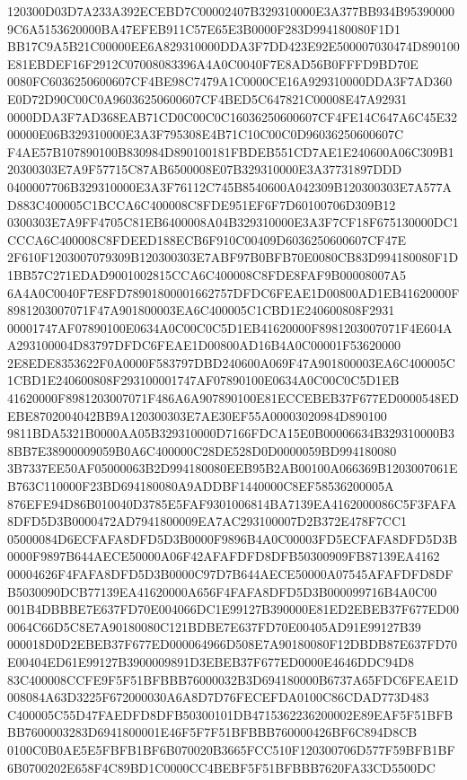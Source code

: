 \documentclass[UTF8,fontset=fandol,zihao=-4,a4paper]{ctexart}
\begin{document}
{{120300D03D7A233A392ECEBD7C00002407B329310000E3A377BB934B953900009C6A5153620000BA47EFEB911C57E65E3B0000F283D994180080F1D1
BB17C9A5B21C00000EE6A829310000DDA3F7DD423E92E500007030474D890100E81EBDEF16F2912C07008083396A4A0C0040F7E8AD56B0FFFD9BD70E
0080FC6036250600607CF4BE98C7479A1C0000CE16A929310000DDA3F7AD360E0D72D90C00C0A96036250600607CF4BED5C647821C00008E47A92931
0000DDA3F7AD368EAB71CD0C00C0C16036250600607CF4FE14C647A6C45E3200000E06B329310000E3A3F795308E4B71C10C00C0D96036250600607C
F4AE57B107890100B830984D890100181FBDEB551CD7AE1E240600A06C309B120300303E7A9F57715C87AB6500008E07B329310000E3A37731897DDD
0400007706B329310000E3A3F76112C745B8540600A042309B120300303E7A577AD883C400005C1BCCA6C400008C8FDE951EF6F7D60100706D309B12
0300303E7A9FF4705C81EB6400008A04B329310000E3A3F7CF18F675130000DC1CCCA6C400008C8FDEED188ECB6F910C00409D6036250600607CF47E
2F610F1203007079309B120300303E7ABF97B0BFB70E0080CB83D994180080F1D1BB57C271EDAD9001002815CCA6C400008C8FDE8FAF9B00008007A5
6A4A0C0040F7E8FD78901800001662757DFDC6FEAE1D00800AD1EB41620000F8981203007071F47A901800003EA6C400005C1CBD1E240600808F2931
00001747AF07890100E0634A0C00C0C5D1EB41620000F8981203007071F4E604AA293100004D83797DFDC6FEAE1D00800AD16B4A0C00001F53620000
2E8EDE8353622F0A0000F583797DBD240600A069F47A901800003EA6C400005C1CBD1E240600808F293100001747AF07890100E0634A0C00C0C5D1EB
41620000F8981203007071F486A6A907890100E81ECCEBEB37F677ED0000548EDEBE8702004042BB9A120300303E7AE30EF55A00003020984D890100
9811BDA5321B0000AA05B329310000D7166FDCA15E0B00006634B329310000B38BB7E38900009059B0A6C400000C28DE528D0D0000059BD994180080
3B7337EE50AF05000063B2D994180080EEB95B2AB00100A066369B1203007061EB763C110000F23BD694180080A9ADDBF1440000C8EF58536200005A
876EFE94D86B010040D3785E5FAF9301006814BA7139EA4162000086C5F3FAFA8DFD5D3B0000472AD7941800009EA7AC293100007D2B372E478F7CC1
05000084D6ECFAFA8DFD5D3B0000F9896B4A0C00003FD5ECFAFA8DFD5D3B0000F9897B644AECE50000A06F42AFAFDFD8DFB50300909FB87139EA4162
00004626F4FAFA8DFD5D3B0000C97D7B644AECE50000A07545AFAFDFD8DFB5030090DCB77139EA41620000A656F4FAFA8DFD5D3B000099716B4A0C00
001B4DBBBE7E637FD70E004066DC1E99127B390000E81ED2EBEB37F677ED000064C66D5C8E7A90180080C121BDBE7E637FD70E00405AD91E99127B39
000018D0D2EBEB37F677ED000064966D508E7A90180080F12DBDB87E637FD70E00404ED61E99127B3900009891D3EBEB37F677ED0000E4646DDC94D8
83C400008CCFE9F5F51BFBBB76000032B3D694180000B6737A65FDC6FEAE1D008084A63D3225F672000030A6A8D7D76FECEFDA0100C86CDAD773D483
C400005C55D47FAEDFD8DFB50300101DB4715362236200002E89EAF5F51BFBBB7600003283D6941800001E46F5F7F51BFBBB760000426BF6C894D8CB
0100C0B0AE5E5FBFB1BF6B070020B3665FCC510F120300706D577F59BFB1BF6B0700202E658F4C89BD1C0000CC4BEBF5F51BFBBB7620FA33CD5500DC
}}
\end{document}

